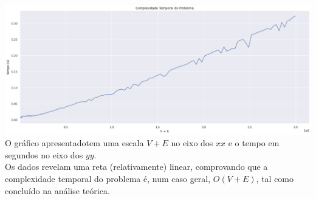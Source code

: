 \documentclass[12pt,a4paper]{article}
\begin{document}
  \includegraphics[width=1\textwidth]{report.png}
  O gráfico apresentadotem uma escala $V + E$ no eixo dos $xx$ e o tempo em segundos no eixo dos $yy$.\\
  Os dados revelam uma reta (relativamente) linear, comprovando que a complexidade temporal do problema é, num caso geral, $O(V + E)$, tal como concluído na análise teórica.
\end{document}
